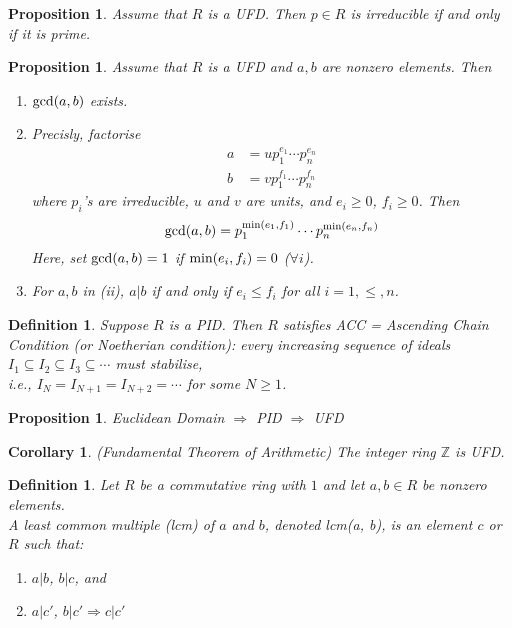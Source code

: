 \documentclass[a4paper,8pt]{article}
\newcommand{\Z}{\mathbb{Z}}
\newcommand{\hlt}[1]{\textit{{\color{blue}#1}}}
\newcommand{\gcds}[1]{\textnormal{gcd}#1}
\newcommand{\mins}[1]{\textnormal{min}#1}
\newcommand{\lcms}[1]{\textnormal{lcm}#1}
\theoremstyle{theorem}
\newtheorem{corollary}[theorem]{Corollary}
\newtheorem{proposition}[theorem]{Proposition}
\newtheorem{definition}[theorem]{Definition}
\begin{document}
\begin{proposition}
Assume that $R$ is a UFD. Then $p \in R$ is irreducible if and only if it is prime.	
\end{proposition}

\begin{proposition}
Assume that $R$ is a UFD and $a,b$ are nonzero elements. Then
\begin{enumerate}[label=(\roman*)]
\item $\gcds(a,b)$ exists.
\item Precisly, factorise
\begin{align}
a&=u p_1^{e_1} \cdots p_n^{e_n} \nonumber \\
b&=v p_1^{f_1} \cdots p_n^{f_n} \nonumber
\end{align}
where $p_i$'s are irreducible, $u$ and $v$ are units, and $e_i \geq 0$, $f_i \geq 0$. Then
\begin{equation}
\gcds(a,b) = p_1^{\mins(e_1, f_1)} \cdots p_n^{\mins(e_n, f_n)} \nonumber
\end{equation}
Here, set $\gcds(a,b) =1$ if $\mins(e_i, f_i) = 0$ ($\forall i$).
\item For $a,b$ in (ii), $a|b$ if and only if $e_i \leq f_i$ for all $i=1, \leq, n$.
\end{enumerate}
\end{proposition}

\begin{definition}
Suppose $R$ is a PID. Then $R$ satisfies \hlt{ACC = Ascending Chain Condition} (or \hlt{Noetherian} condition): every increasing sequence of ideals $I_1 \subseteq I_2 \subseteq I_3 \subseteq \cdots$ must stabilise, \\
i.e., $I_N = I_{N+1} = I_{N+2} = \cdots$ for some $N \geq 1$.
\end{definition}

\begin{proposition}
Euclidean Domain $\Rightarrow$ PID $\Rightarrow$ UFD
\end{proposition}

\begin{corollary}
\hlt{(Fundamental Theorem of Arithmetic)} The integer ring $\Z$ is UFD.
\end{corollary}

\begin{definition}
Let $R$ be a commutative ring with $1$ and let $a,b \in R$ be nonzero elements.\\
A \hlt{least common multiple (lcm)} of $a$ and $b$, denoted \lcms(a, b), is an element $c$ or $R$ such that:
\begin{enumerate}[label=(\roman*)]
\item $a|b$, $b|c$, and
\item $a|c'$, $b|c' \Rightarrow c|c'$ 
\end{enumerate}
\end{definition}
\end{document}

